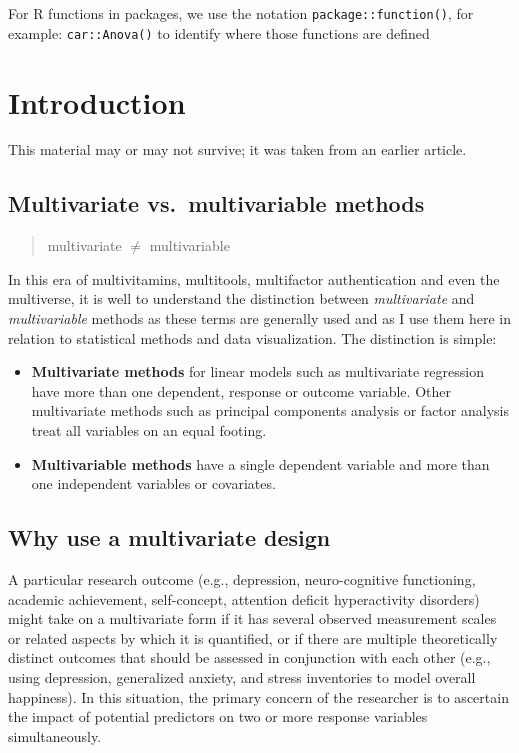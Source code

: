 \documentclass[
  letterpaper,
  10pt,
  krantz2]{krantz}
\begin{document}
For R functions in packages, we use the notation
\texttt{package::function()}, for example: \texttt{car::Anova()} to
identify where those functions are defined

\mainmatter


\chapter{Introduction}\label{sec-introduction}

This material may or may not survive; it was taken from an earlier
article.

\section{Multivariate vs.~multivariable
methods}\label{multivariate-vs.-multivariable-methods}

\begin{quote}
multivariate \(\ne\) multivariable
\end{quote}

In this era of multivitamins, multitools, multifactor authentication and
even the multiverse, it is well to understand the distinction between
\emph{multivariate} and \emph{multivariable} methods as these terms are
generally used and as I use them here in relation to statistical methods
and data visualization. The distinction is simple:

\begin{itemize}
\item
  \textbf{Multivariate methods} for linear models such as multivariate
  regression have more than one dependent, response or outcome variable.
  Other multivariate methods such as principal components analysis or
  factor analysis treat all variables on an equal footing.
\item
  \textbf{Multivariable methods} have a single dependent variable and
  more than one independent variables or covariates.
\end{itemize}

\section{Why use a multivariate
design}\label{why-use-a-multivariate-design}

A particular research outcome (e.g., depression, neuro-cognitive
functioning, academic achievement, self-concept, attention deficit
hyperactivity disorders) might take on a multivariate form if it has
several observed measurement scales or related aspects by which it is
quantified, or if there are multiple theoretically distinct outcomes
that should be assessed in conjunction with each other (e.g., using
depression, generalized anxiety, and stress inventories to model overall
happiness). In this situation, the primary concern of the researcher is
to ascertain the impact of potential predictors on two or more response
variables simultaneously.
\end{document}
